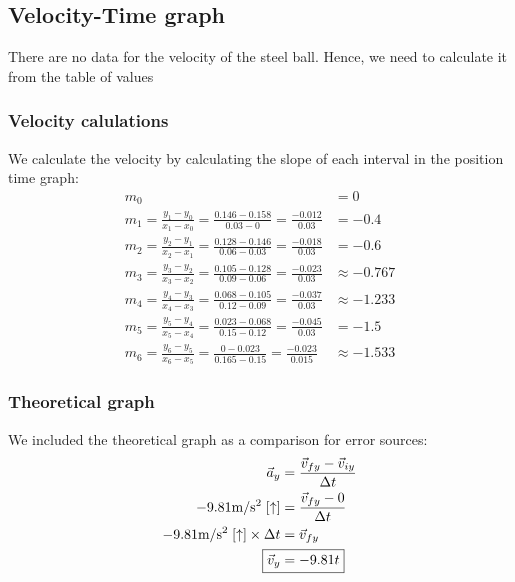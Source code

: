 \documentclass[a4paper,12pt]{article}
\begin{document}
	\subsection{Velocity-Time graph}
	There are no data for the velocity of the steel ball. Hence, we need to calculate it from the table of values
	\subsubsection{Velocity calulations}
	We calculate the velocity by calculating the slope of each interval in the position time graph:
	\begin{align*}
		m_0&=0\\
		m_1=\frac{y_1-y_0}{x_1-x_0}=\frac{0.146-0.158}{0.03-0}=\frac{-0.012}{0.03}&=-0.4\\
		m_2=\frac{y_2-y_1}{x_2-x_1}=\frac{0.128-0.146}{0.06-0.03}=\frac{-0.018}{0.03}&=-0.6\\
		m_3=\frac{y_3-y_2}{x_3-x_2}=\frac{0.105-0.128}{0.09-0.06}=\frac{-0.023}{0.03}&\approx-0.767\\	m_4=\frac{y_4-y_3}{x_4-x_3}=\frac{0.068-0.105}{0.12-0.09}=\frac{-0.037}{0.03}&\approx-1.233\\
		m_5=\frac{y_5-y_4}{x_5-x_4}=\frac{0.023-0.068}{0.15-0.12}=\frac{-0.045}{0.03}&=-1.5\\
		m_6=\frac{y_6-y_5}{x_6-x_5}=\frac{0-0.023}{0.165-0.15}=\frac{-0.023}{0.015}&\approx-1.533
	\end{align*}
	
	\subsubsection{Theoretical graph}
	We included the theoretical graph as a comparison for error sources:
	\begin{align*}
		\vec{a}_y&=\frac{\vec{v}_{fy}-\vec{v}_{iy}}{\Delta t}\\
		-9.81\text{m}/\text{s}^2\;[\uparrow]&=\frac{\vec{v}_{fy}-0}{\Delta t}\\
		-9.81\text{m}/\text{s}^2\;[\uparrow]\times\Delta t&=\vec{v}_{fy}\\
		\Aboxed{\vec{v}_y&=-9.81t}
	\end{align*}
	
\end{document}
